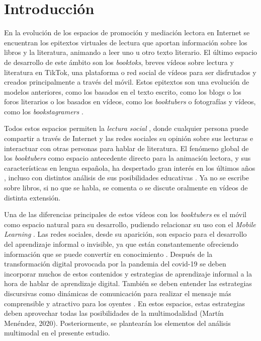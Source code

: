 \section{Introducción}\label{sec-introducción}

En la evolución de los espacios de promoción y mediación lectora en
Internet se encuentran los epitextos virtuales de lectura \cite{lluch2015} que aportan información sobre los
libros y la literatura, animando a leer uno u otro texto literario. El
último espacio de desarrollo de este ámbito son los \emph{booktoks},
breves vídeos sobre lectura y literatura en TikTok, una plataforma o red
social de vídeos para ser disfrutados y creados principalmente a través
del móvil. Estos epitextos son una evolución de modelos anteriores, como
los basados en el texto escrito, como los blogs o los foros literarios o
los basados en vídeos, como los \emph{booktubers} \cite{sorensen2014}
o fotografías y vídeos, como los \emph{bookstagramers} \cite{sánchezgarcía2020}.


Todos estos espacios permiten la \emph{lectura social} \cite{cordon2013}, donde cualquier persona puede compartir a través
de Internet y las redes sociales su opinión sobre sus lecturas e
interactuar con otras personas para hablar de literatura. El fenómeno
global de los \emph{booktubers} como espacio antecedente directo para la
animación lectora, y sus características en lengua española, ha
despertado gran interés en los últimos años \cite{vizcaino2019,tomasena2021}, incluso con
distintos análisis de sus posibilidades educativas \cite{roviracollado2016}. Ya no se escribe sobre libros, si no que se habla, se comenta o
se discute oralmente en vídeos de distinta extensión.

Una de las diferencias principales de estos vídeos con los
\emph{booktubers} es el móvil como espacio natural para su desarrollo,
pudiendo relacionar su uso con el \emph{Mobile} \emph{Learning} \cite{unesco2013}. Las redes sociales, desde su aparición, son espacio para el
desarrollo del aprendizaje informal o invisible, ya que están
constantemente ofreciendo información que se puede convertir en
conocimiento \cite{piscitelli2010}. Después de la
transformación digital provocada por la pandemia del covid-19 se deben
incorporar muchos de estos contenidos y estrategias de aprendizaje
informal a la hora de hablar de aprendizaje digital. También se deben
entender las estrategias discursivas como dinámicas de comunicación para
realizar el mensaje más comprensible y atractivo para los oyentes \cite{coll2021}. En estos espacios, estas estrategias deben aprovechar
todas las posibilidades de la multimodalidad (Martín Menéndez, 2020).
Posteriormente, se plantearán los elementos del análisis multimodal en
el presente estudio.

